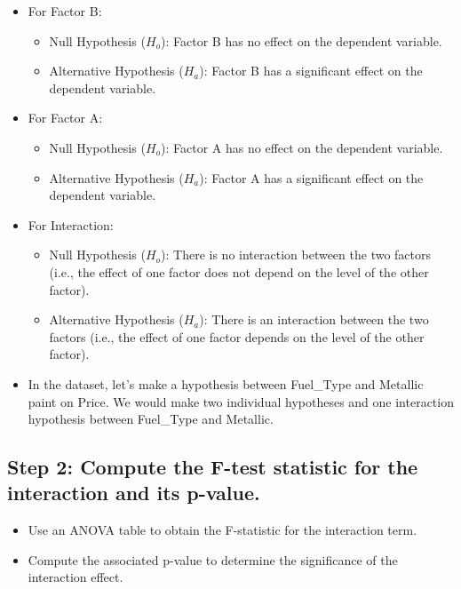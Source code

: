 \documentclass[
  letterpaper,
  DIV=11,
  numbers=noendperiod]{scrreprt}
\providecommand{\tightlist}{%
  \setlength{\itemsep}{0pt}\setlength{\parskip}{0pt}}\usepackage{longtable,booktabs,array}
\begin{document}
\begin{itemize}
\tightlist
\item
  For Factor B:

  \begin{itemize}
  \tightlist
  \item
    Null Hypothesis (\(H_o\)): Factor B has no effect on the dependent
    variable.
  \item
    Alternative Hypothesis (\(H_a\)): Factor B has a significant effect
    on the dependent variable.
  \end{itemize}
\item
  For Factor A:

  \begin{itemize}
  \tightlist
  \item
    Null Hypothesis (\(H_o\)): Factor A has no effect on the dependent
    variable.
  \item
    Alternative Hypothesis (\(H_a\)): Factor A has a significant effect
    on the dependent variable.
  \end{itemize}
\item
  For Interaction:

  \begin{itemize}
  \tightlist
  \item
    Null Hypothesis (\(H_o\)): There is no interaction between the two
    factors (i.e., the effect of one factor does not depend on the level
    of the other factor).
  \item
    Alternative Hypothesis (\(H_a\)): There is an interaction between
    the two factors (i.e., the effect of one factor depends on the level
    of the other factor).
  \end{itemize}
\item
  In the dataset, let's make a hypothesis between Fuel\_Type and
  Metallic paint on Price. We would make two individual hypotheses and
  one interaction hypothesis between Fuel\_Type and Metallic.
\end{itemize}

\subsection{Step 2: Compute the F-test statistic for the interaction and
its
p-value.}\label{step-2-compute-the-f-test-statistic-for-the-interaction-and-its-p-value.}

\begin{itemize}
\tightlist
\item
  Use an ANOVA table to obtain the F-statistic for the interaction term.
\item
  Compute the associated p-value to determine the significance of the
  interaction effect.
\end{itemize}
\end{document}
